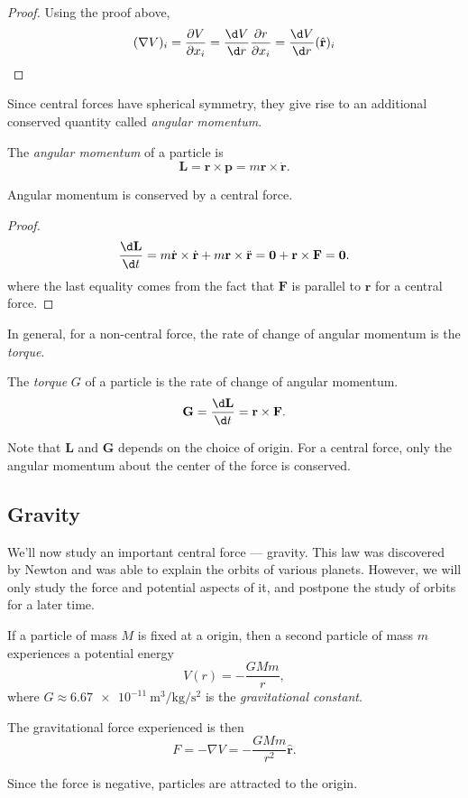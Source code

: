 \documentclass[a4paper]{article}
\begin{document}
\begin{proof}
  Using the proof above,
  \[
    (\nabla V)_i = \frac{\partial V}{\partial x_i} = \frac{\d V}{\d r} \frac{\partial r}{\partial x_i} = \frac{\d V}{\d r}(\hat{\mathbf{r}})_i
  \]
\end{proof}
Since central forces have spherical symmetry, they give rise to an additional conserved quantity called \emph{angular momentum}.

\begin{defi}
  The \emph{angular momentum} of a particle is
  \[
    \mathbf{L} = \mathbf{r}\times \mathbf{p} = m\mathbf{r}\times \dot{\mathbf{r}}.
  \]
\end{defi}

\begin{prop}
  Angular momentum is conserved by a central force.
\end{prop}

\begin{proof}
  \[
    \frac{\d \mathbf{L}}{\d t} = m\dot{\mathbf{r}} \times \dot{\mathbf{r}} + m\mathbf{r}\times \ddot{\mathbf{r}} = \mathbf{0} + \mathbf{r}\times \mathbf{F} = \mathbf{0}.
  \]
  where the last equality comes from the fact that $\mathbf{F}$ is parallel to $\mathbf{r}$ for a central force.
\end{proof}
In general, for a non-central force, the rate of change of angular momentum is the \emph{torque}.
\begin{defi}[Torque]
  The \emph{torque} $G$ of a particle is the rate of change of angular momentum.
  \[
    \mathbf{G} = \frac{\d \mathbf{L}}{\d t} = \mathbf{r}\times \mathbf{F}.
  \]
\end{defi}

Note that $\mathbf{L}$ and $\mathbf{G}$ depends on the choice of origin. For a central force, only the angular momentum about the center of the force is conserved.

\subsection{Gravity}
We'll now study an important central force --- gravity. This law was discovered by Newton and was able to explain the orbits of various planets. However, we will only study the force and potential aspects of it, and postpone the study of orbits for a later time.

\begin{law}
  If a particle of mass $M$ is fixed at a origin, then a second particle of mass $m$ experiences a potential energy
  \[
    V(r) = -\frac{GMm}{r},
  \]
  where $G \approx \SI{6.67e-11}{\meter\cubed\per\kilogram\per\second\squared}$ is the \emph{gravitational constant}.

  The gravitational force experienced is then
  \[
    F = -\nabla V = -\frac{GMm}{r^2}\hat{\mathbf{r}}.
  \]
\end{law}
Since the force is negative, particles are attracted to the origin.
\end{document}
